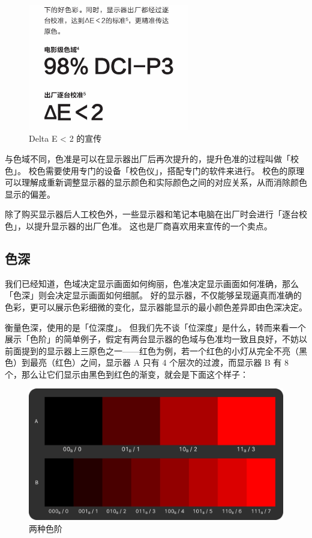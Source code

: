 \begin{figure}[htb!]
  \centering
  \includegraphics[width=7cm]{assets/Delta_E_below_2.jpg}
  \caption{Delta E < 2 的宣传}
  \label{Delta_E_below_2}
\end{figure}

与色域不同，色准是可以在显示器出厂后再次提升的，提升色准的过程叫做「校色」。
校色需要使用专门的设备「校色仪」，搭配专门的软件来进行。
校色的原理可以理解成重新调整显示器的显示颜色和实际颜色之间的对应关系，从而消除颜色显示的偏差。

除了购买显示器后人工校色外，一些显示器和笔记本电脑在出厂时会进行「逐台校色」，以提升显示器的出厂色准。
这也是厂商喜欢用来宣传的一个卖点。

\subsection{色深}

我们已经知道，色域决定显示画面如何绚丽，色准决定显示画面如何准确，那么「色深」则会决定显示画面如何细腻。
好的显示器，不仅能够呈现逼真而准确的色彩，更可以展示色彩细微的变化，显示器能显示的最小颜色差异即由色深决定。

衡量色深，使用的是「位深度」。
但我们先不谈「位深度」是什么，转而来看一个展示「色阶」的简单例子，假定有两台显示器的色域与色准均一致且良好，不妨以前面提到的显示器上三原色之一——红色为例，若一个红色的小灯从完全不亮（黑色）到最亮（红色）之间，显示器 A 只有 4 个层次的过渡，而显示器 B 有 8 个，那么让它们显示由黑色到红色的渐变，就会是下面这个样子：

\begin{figure}[htb!]
  \centering
  \includegraphics[width=.8\textwidth]{assets/Color_Gradient.png}
  \caption{两种色阶}
  \label{Color_Gradient}
\end{figure}

